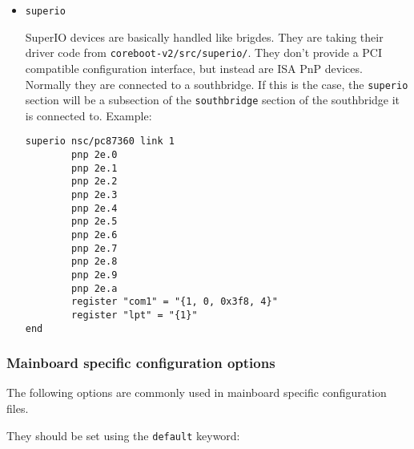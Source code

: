 \documentclass[titlepage,12pt]{article}
\begin{document}
\begin{itemize}
\item \begin{verbatim}superio\end{verbatim}

SuperIO devices are basically handled like brigdes. They are taking
their driver code from \texttt{coreboot-v2/src/superio/}. They don't
provide a PCI compatible configuration interface, but instead are ISA
PnP devices. Normally they are connected to a southbridge. If this is
the case, the \texttt{superio} section will be a subsection of the
\texttt{southbridge} section of the southbridge it is connected to.
Example:

\begin{verbatim}
superio nsc/pc87360 link 1
        pnp 2e.0
        pnp 2e.1
        pnp 2e.2
        pnp 2e.3
        pnp 2e.4
        pnp 2e.5
        pnp 2e.6
        pnp 2e.7
        pnp 2e.8
        pnp 2e.9
        pnp 2e.a
        register "com1" = "{1, 0, 0x3f8, 4}"
        register "lpt" = "{1}"
end
\end{verbatim}

\end{itemize}

\newpage

\subsubsection{Mainboard specific configuration options}

The following options are commonly used in mainboard specific
configuration files.

They should be set using the \texttt{default} keyword:
\end{document}
